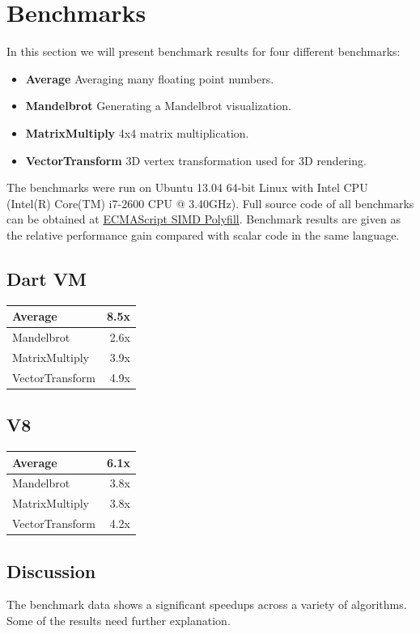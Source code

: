 \documentclass[preprint]{sigplanconf}
\begin{document}
\section{Benchmarks}
In this section we will present benchmark results for four different benchmarks:
\begin{itemize}
\item \textbf{Average} Averaging many floating point numbers.
\item \textbf{Mandelbrot} Generating a Mandelbrot\cite{mandelbrot} visualization.
\item \textbf{MatrixMultiply} 4x4 matrix multiplication.
\item \textbf{VectorTransform} 3D vertex transformation used for 3D rendering.
\end{itemize}

The benchmarks were run on Ubuntu 13.04 64-bit Linux with Intel CPU (Intel(R) Core(TM) i7-2600 CPU @ 3.40GHz). Full source code of all benchmarks can be obtained at \href{https://github.com/johnmccutchan/ecmascript_simd/}{ECMAScript SIMD Polyfill}. Benchmark results are given as the relative performance gain compared with scalar code in the same language.

\subsection{Dart VM}
\begin{tabular}{|l|r|}
\hline
 Average & 8.5x \\
 \hline
 Mandelbrot & 2.6x \\
 \hline
 MatrixMultiply & 3.9x \\
 \hline
 VectorTransform & 4.9x \\
 \hline
\end{tabular}

\subsection{V8}
\begin{tabular}{|l|r|}
\hline
 Average & 6.1x \\
 \hline
 Mandelbrot & 3.8x \\
 \hline
 MatrixMultiply & 3.8x \\
 \hline
 VectorTransform & 4.2x \\
 \hline
\end{tabular}

\subsection{Discussion}
The benchmark data shows a significant speedups across a variety of algorithms. Some of the results need further explanation. 
\end{document}
